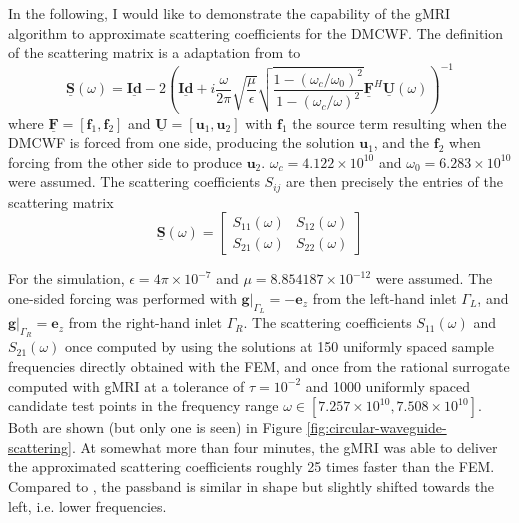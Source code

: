 \documentclass[11pt, a4paper]{article}
\begin{document}
In the following, I would like to demonstrate the capability of the 
\acrshort{gMRI} algorithm to approximate scattering coefficients for the \acrshort{DMCWF}.
The definition of the scattering matrix is a adaptation from \cite{shortMRI} to
\begin{equation}
    \mathbf{\underline{S}}(\omega) = \mathbf{\underline{Id}}
    - 2\left( \mathbf{\underline{Id}} + i \frac{\omega}{2\pi} \sqrt{\frac{\mu}{\epsilon}}
    \sqrt{\frac{1 - (\omega_c / \omega_0)^2}{1 - (\omega_c / \omega)^2}} 
    \mathbf{\underline{F}}^H \mathbf{\underline{U}}(\omega) \right)^{-1}
\end{equation}
where $\mathbf{\underline{F}} = [\mathbf{f}_1, \mathbf{f}_2]$ and
$\mathbf{\underline{U}} = [\mathbf{u}_1, \mathbf{u}_2]$ with $\mathbf{f}_1$ the source term
resulting when the \acrshort{DMCWF} is forced from one side, producing the
solution $\mathbf{u}_1$, and the $\mathbf{f}_2$ when forcing from the other side to
produce $\mathbf{u}_2$. $\omega_c = 4.122 \times 10^{10}$ and $\omega_0 = 6.283 \times 10^{10}$
were assumed. The scattering coefficients $S_{ij}$ are then precisely the
entries of the scattering matrix
\begin{equation}
    \mathbf{\underline{S}}(\omega) =
    \begin{bmatrix}
            S_{11}(\omega) & S_{12}(\omega) \\
            S_{21}(\omega) & S_{22}(\omega)
    \end{bmatrix}\label{equ:scattering-coefficients}
\end{equation}

For the simulation, $\epsilon = 4 \pi \times 10^{-7}$ and 
$\mu = 8.854187 \times 10^{-12}$ were assumed. The one-sided forcing
was performed with $\left.\mathbf{g}\right|_{\Gamma_L} = - \mathbf{e}_z$ from the
left-hand inlet $\Gamma_L$, and $\left.\mathbf{g}\right|_{\Gamma_R} = \mathbf{e}_z$ from the
right-hand inlet $\Gamma_R$. The scattering coefficients $S_{11}(\omega)$ and $S_{21}(\omega)$
once computed by using the solutions at 150 uniformly spaced sample frequencies
directly obtained with the \acrshort{FEM},
and once from the rational surrogate computed with \acrshort{gMRI} at a tolerance
of $\tau = 10^{-2}$ and 1000 uniformly spaced candidate test points in
the frequency range $\omega \in [7.257 \times 10^{10}, 7.508 \times 10^{10}]$. Both are shown (but only one is seen) in Figure
\ref{fig:circular-waveguide-scattering}. At somewhat more than four minutes,
the \acrshort{gMRI} was able to deliver the approximated scattering coefficients
roughly 25 times faster than the \acrshort{FEM}. Compared to \cite{DMCWF-FrequencySweep},
the passband is similar in shape but slightly shifted towards the left, i.e. lower
frequencies.
\end{document}
